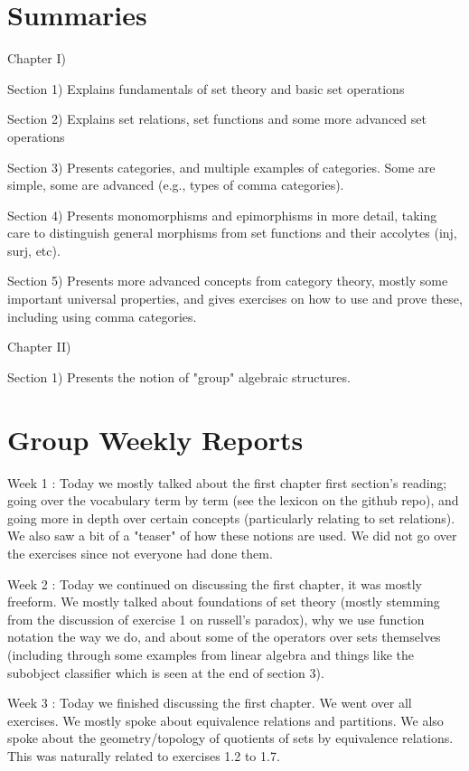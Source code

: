 \part{Summaries}

Chapter I)

Section 1) Explains fundamentals of set theory and basic set operations

Section 2) Explains set relations, set functions and some more advanced set operations

Section 3) Presents categories, and multiple examples of categories. Some are simple, some are advanced (e.g., types of comma categories).

Section 4) Presents monomorphisms and epimorphisms in more detail, taking care to distinguish general morphisms from set functions and their accolytes (inj, surj, etc).

Section 5) Presents more advanced concepts from category theory, mostly some important universal properties, and gives exercises on how to use and prove these, including using comma categories.


Chapter II)

Section 1) Presents the notion of "group" algebraic structures.



\newpage


\part{Group Weekly Reports}

Week 1 : Today we mostly talked about the first chapter first section's reading; going over the vocabulary term by term (see the lexicon on the github repo), and going more in depth over certain concepts (particularly relating to set relations). We also saw a bit of a "teaser" of how these notions are used. We did not go over the exercises since not everyone had done them.

Week 2 : Today we continued on discussing the first chapter, it was mostly freeform. We mostly talked about foundations of set theory (mostly stemming from the discussion of exercise 1 on russell's paradox), why we use function notation the way we do, and about some of the operators over sets themselves (including through some examples from linear algebra and things like the subobject classifier which is seen at the end of section 3). 

Week 3 : Today we finished discussing the first chapter. We went over all exercises. We mostly spoke about equivalence relations and partitions. We also spoke about the geometry/topology of quotients of sets by equivalence relations. This was naturally related to exercises 1.2 to 1.7.


